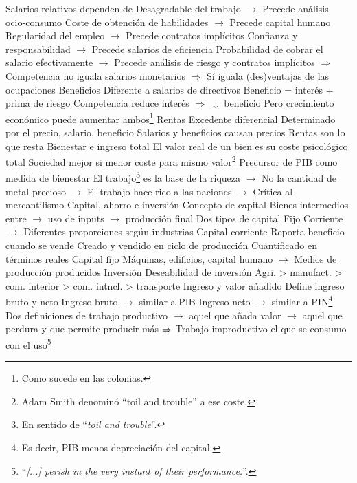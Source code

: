 \documentclass{nuevotema}
\begin{document}
\begin{esquemal}
				\4 Salarios relativos dependen de
				\4[(i)] Desagradable del trabajo
				\4[] $\to$ Precede análisis ocio-consumo
				\4[(ii)] Coste de obtención de habilidades
				\4[] $\to$ Precede capital humano
				\4[(iii)] Regularidad del empleo
				\4[] $\to$ Precede contratos implícitos
				\4[(iv)] Confianza y responsabilidad
				\4[] $\to$ Precede salarios de eficiencia
				\4[(v)] Probabilidad de cobrar el salario efectivamente
				\4[] $\to$ Precede análisis de riesgo y contratos implícitos
				\4[] $\Rightarrow$ Competencia no iguala salarios monetarios
				\4[] $\Rightarrow$ Sí iguala (des)ventajas de las ocupaciones
			\3 Beneficios
				\4 Diferente a salarios de directivos
				\4[] Beneficio =  interés + prima de riesgo
				\4[] Competencia reduce interés $\Rightarrow$ $\downarrow$ beneficio
				\4[] Pero crecimiento económico puede aumentar ambos\footnote{Como sucede en las colonias.}
			\3 Rentas
				\4 Excedente diferencial
				\4 Determinado por el precio, salario, beneficio
				\4 Salarios y beneficios causan precios
				\4 Rentas son lo que resta
			\3 Bienestar e ingreso total
				\4 El valor real de un bien es su coste psicológico total
				\4 Sociedad mejor si menor coste para mismo valor\footnote{Adam Smith denominó ``toil and trouble'' a ese coste.}
				\4[] Precursor de PIB como medida de bienestar
				\4[] El trabajo\footnote{En sentido de ``\textit{toil and trouble}''.} es la base de la riqueza
				\4[] $\to$ No la cantidad de metal precioso
				\4[] $\to$ El trabajo hace rico a las naciones
				\4[] $\to$ Crítica al mercantilismo
		\2 Capital, ahorro e inversión
			\3 Concepto de capital
				\4 Bienes intermedios entre
				\4[] $\to$ uso de inputs
				\4[] $\to$ producción final
				\4 Dos tipos de capital
				\4[] Fijo
				\4[] Corriente
				\4[] $\to$ Diferentes proporciones según industrias
			\3 Capital corriente
				\4 Reporta beneficio cuando se vende
				\4 Creado y vendido en ciclo de producción
				\4 Cuantificado en términos reales
			\3 Capital fijo
				\4 Máquinas, edificios, capital humano
				\4[] $\to$ Medios de producción producidos
			\3 Inversión
				\4 Deseabilidad de inversión
				\4[] Agri. > manufact. > com. interior > com. intncl. > transporte
				\4 Ingreso y valor añadido
				\4[] Define ingreso bruto y neto
				\4[] Ingreso bruto $\to$ similar a PIB
				\4[] Ingreso neto $\to$ similar a PIN\footnote{Es decir, PIB menos depreciación del capital.}
				\4 Dos definiciones de trabajo productivo
				\4[] $\to$ aquel que añada valor
				\4[] $\to$ aquel que perdura y que permite producir más
				\4[] $\Rightarrow$ Trabajo improductivo el que se consumo con el uso\footnote{``\textit{[...] perish in the very instant of their performance.}''.}

\end{esquemal}
\end{document}

